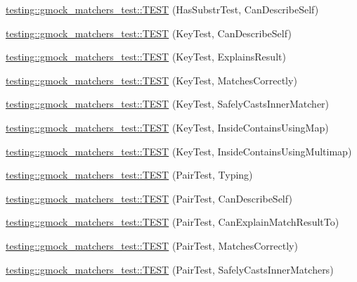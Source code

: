 \begin{DoxyCompactItemize}
\item 
\hyperlink{namespacetesting_1_1gmock__matchers__test_ae47e8ad8f8a4a33ac08b596eb839380e}{testing\+::gmock\+\_\+matchers\+\_\+test\+::\+T\+E\+ST} (Has\+Substr\+Test, Can\+Describe\+Self)
\item 
\hyperlink{namespacetesting_1_1gmock__matchers__test_acdbdca45a537261fd168cdb8df9348d7}{testing\+::gmock\+\_\+matchers\+\_\+test\+::\+T\+E\+ST} (Key\+Test, Can\+Describe\+Self)
\item 
\hyperlink{namespacetesting_1_1gmock__matchers__test_a38169c972e14fef59a41e532fb5b431e}{testing\+::gmock\+\_\+matchers\+\_\+test\+::\+T\+E\+ST} (Key\+Test, Explains\+Result)
\item 
\hyperlink{namespacetesting_1_1gmock__matchers__test_a39f4f76617c414ab715b701eb82eeee4}{testing\+::gmock\+\_\+matchers\+\_\+test\+::\+T\+E\+ST} (Key\+Test, Matches\+Correctly)
\item 
\hyperlink{namespacetesting_1_1gmock__matchers__test_a6b05d274d57a4aa120bb497c34ce3a68}{testing\+::gmock\+\_\+matchers\+\_\+test\+::\+T\+E\+ST} (Key\+Test, Safely\+Casts\+Inner\+Matcher)
\item 
\hyperlink{namespacetesting_1_1gmock__matchers__test_af9f4e295413489a7e3acafc59584c3c4}{testing\+::gmock\+\_\+matchers\+\_\+test\+::\+T\+E\+ST} (Key\+Test, Inside\+Contains\+Using\+Map)
\item 
\hyperlink{namespacetesting_1_1gmock__matchers__test_af90ca00690094484af6c34eadf4dd7c3}{testing\+::gmock\+\_\+matchers\+\_\+test\+::\+T\+E\+ST} (Key\+Test, Inside\+Contains\+Using\+Multimap)
\item 
\hyperlink{namespacetesting_1_1gmock__matchers__test_a5689064ea3fe50424dd1ea036d107aa8}{testing\+::gmock\+\_\+matchers\+\_\+test\+::\+T\+E\+ST} (Pair\+Test, Typing)
\item 
\hyperlink{namespacetesting_1_1gmock__matchers__test_a672ba279448f634fae495ed7dc9260bd}{testing\+::gmock\+\_\+matchers\+\_\+test\+::\+T\+E\+ST} (Pair\+Test, Can\+Describe\+Self)
\item 
\hyperlink{namespacetesting_1_1gmock__matchers__test_a4ee8f3967e3658cd7bd340558922f131}{testing\+::gmock\+\_\+matchers\+\_\+test\+::\+T\+E\+ST} (Pair\+Test, Can\+Explain\+Match\+Result\+To)
\item 
\hyperlink{namespacetesting_1_1gmock__matchers__test_acdb02e9ac603c91b35602751f6a81239}{testing\+::gmock\+\_\+matchers\+\_\+test\+::\+T\+E\+ST} (Pair\+Test, Matches\+Correctly)
\item 
\hyperlink{namespacetesting_1_1gmock__matchers__test_ad2110445fe8f2f8ca947540f2a400228}{testing\+::gmock\+\_\+matchers\+\_\+test\+::\+T\+E\+ST} (Pair\+Test, Safely\+Casts\+Inner\+Matchers)

\end{DoxyCompactItemize}
